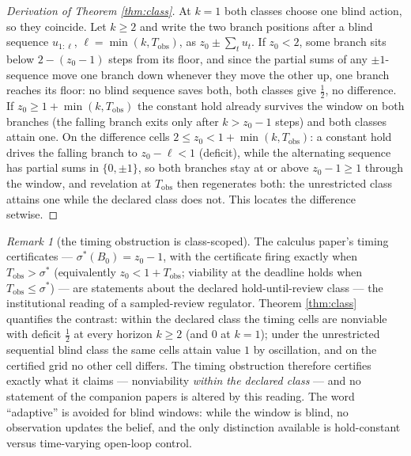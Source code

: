 \documentclass[10pt,twocolumn]{article}
\theoremstyle{plain}
\theoremstyle{definition}
\theoremstyle{remark}
\newtheorem{remark}[theorem]{Remark}
\begin{document}
\begin{proof}[Derivation of Theorem \ref{thm:class}]
At \(k = 1\) both classes choose one blind action, so they coincide. Let
\(k \ge 2\) and write the two branch positions after a blind sequence
\(u_{1:\ell}\), \(\ell = \min(k, T_{\mathrm{obs}})\), as
\(z_{0} \pm \sum_{t} u_{t}\). If \(z_{0} < 2\), some branch sits below
\(2 - (z_{0} - 1)\) steps from its floor, and since the partial sums of
any \(\pm1\)-sequence move one branch down whenever they move the other
up, one branch reaches its floor: no blind sequence saves both, both
classes give \(\tfrac{1}{2}\), no difference. If
\(z_{0} \ge 1 + \min(k, T_{\mathrm{obs}})\) the constant hold already
survives the window on both branches (the falling branch exits only
after \(k > z_{0} - 1\) steps) and both classes attain one. On the
difference cells \(2 \le z_{0} < 1 + \min(k, T_{\mathrm{obs}})\): a
constant hold drives the
falling branch to \(z_{0} - \ell < 1\) (deficit), while the alternating
sequence has partial sums in \(\{0, \pm 1\}\), so both branches stay at
or above \(z_{0} - 1 \ge 1\) through the window, and revelation at
\(T_{\mathrm{obs}}\) then regenerates both: the unrestricted class
attains one while the declared class does not. This locates the
difference setwise.
\end{proof}

\begin{remark}[the timing obstruction is class-scoped]\label{rem:scope}
The calculus paper's timing certificates --- \(\sigma^{*}(B_{0}) =
z_{0} - 1\), with the certificate firing exactly when
\(T_{\mathrm{obs}} > \sigma^{*}\) (equivalently
\(z_{0} < 1 + T_{\mathrm{obs}}\); viability at the deadline holds when
\(T_{\mathrm{obs}} \le \sigma^{*}\)) --- are statements about the
declared hold-until-review class --- the institutional reading of a
sampled-review regulator. Theorem \ref{thm:class} quantifies the
contrast: within the declared class the timing cells are nonviable with
deficit \(\tfrac{1}{2}\) at every horizon \(k \ge 2\) (and \(0\) at
\(k = 1\)); under the unrestricted sequential blind class the same
cells attain value \(1\) by oscillation, and on the certified grid no
other cell differs. The
timing obstruction therefore certifies exactly what it claims ---
nonviability \emph{within the declared class} --- and no statement of the
companion papers is altered by this reading. The word ``adaptive'' is
avoided for blind windows: while the window is blind, no observation
updates the belief, and the only distinction available is hold-constant
versus time-varying open-loop control.
\end{remark}
\end{document}
